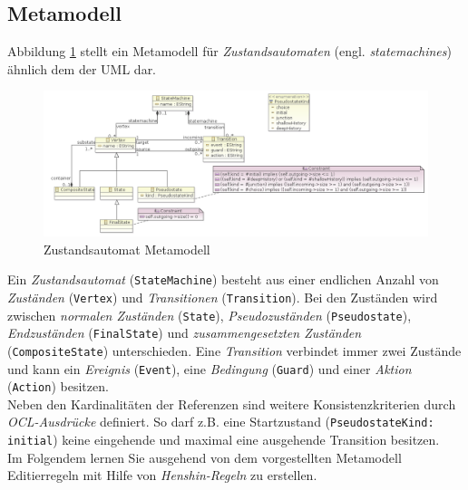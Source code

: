 \documentclass[a4paper]{scrartcl}
\begin{document}

\subsection{Metamodell}\label{subsec:metamodel}
Abbildung \ref{statemachine_metamodel} stellt ein Metamodell für \textit{Zustandsautomaten} (engl. \textit{statemachines}) ähnlich dem der UML dar.

\begin{figure}[H]
\centering
\includegraphics[width=\textwidth]{graphics/statemachine.png}
\caption{Zustandsautomat Metamodell}
\label{statemachine_metamodel}
\end{figure}

Ein \textit{Zustandsautomat} (\texttt{StateMachine}) besteht aus einer endlichen Anzahl von \textit{Zuständen} (\texttt{Vertex}) und \textit{Transitionen} (\texttt{Transition}).
Bei den Zuständen wird zwischen \textit{normalen Zuständen} (\texttt{State}), \textit{Pseudozuständen} (\texttt{Pseudostate}), \textit{Endzuständen} (\texttt{FinalState}) und \textit{zusammengesetzten Zuständen} (\texttt{CompositeState}) unterschieden.
Eine \textit{Transition} verbindet immer zwei Zustände und  kann ein \textit{Ereignis} (\texttt{Event}),  eine \textit{Bedingung} (\texttt{Guard}) und einer \textit{Aktion} (\texttt{Action}) besitzen.\\
Neben den Kardinalitäten der Referenzen sind weitere Konsistenzkriterien durch \textit{OCL-Ausdrücke} definiert. 
So darf z.B. eine Startzustand (\texttt{PseudostateKind: initial}) keine eingehende und maximal eine ausgehende Transition besitzen.\\
Im Folgendem lernen Sie ausgehend von dem vorgestellten Metamodell Editierregeln mit Hilfe von \textit{Henshin-Regeln} zu erstellen.\\
\end{document}
